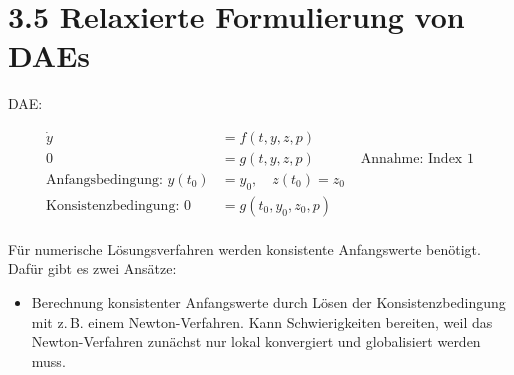 \section*{3.5 Relaxierte Formulierung von DAEs}

DAE:

\begin{align*}
\dot y &= f(t,y,z,p) \\
0 &= g(t,y,z,p) & \text{ Annahme: Index 1}\\
\text{Anfangsbedingung: } y(t_0) &= y_0, \quad z(t_0) = z_0\\
\text{Konsistenzbedingung: } 0 &= g(t_0, y_0, z_0, p) \\
\end{align*}

Für numerische Lösungsverfahren werden konsistente Anfangswerte benötigt. Dafür gibt es zwei Ansätze:

\begin{itemize}
\item Berechnung konsistenter Anfangswerte durch Lösen der Konsistenzbedingung mit z.\,B. einem Newton-Verfahren. Kann Schwierigkeiten bereiten, weil das Newton-Verfahren zunächst nur lokal konvergiert und globalisiert werden muss.
\end{itemize}







